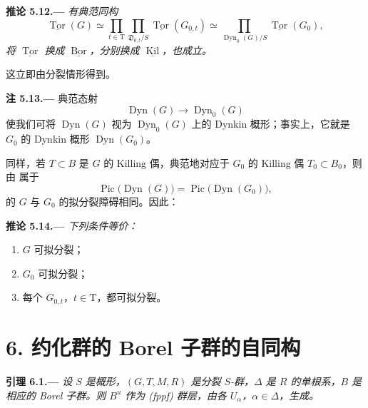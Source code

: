 \par\medskip\noindent{}\textbf{推论 5.12.---}\enspace
\emph{有典范同构}
\[
  \underline{\operatorname{Tor}}(G)
  \simeq
  \prod_{t\in\mathrm T}
  \prod_{\mathfrak D_{0,t}/S}
    \underline{\operatorname{Tor}}(G_{0,t})
  \simeq
  \prod_{\operatorname{Dyn}_0(G)/S}
    \underline{\operatorname{Tor}}(G_0),
\]
\emph{将 \(\underline{\operatorname{Tor}}\) 换成 \(\underline{\operatorname{Bor}}\)，分别换成 \(\underline{\operatorname{Kil}}\)，也成立。}

这立即由分裂情形得到。

\par\medskip\noindent{}\textbf{注 5.13.---}\enspace
典范态射
\[
  \operatorname{Dyn}(G)\longrightarrow\operatorname{Dyn}_0(G)
\]
使我们可将 \(\operatorname{Dyn}(G)\) 视为 \(\operatorname{Dyn}_0(G)\) 上的 Dynkin 概形；事实上，它就是 \(G_0\) 的 Dynkin 概形 \(\operatorname{Dyn}(G_0)\)。

同样，若 \(T\subset B\) 是 \(G\) 的 Killing 偶，典范地对应于 \(G_0\) 的 Killing 偶 \(T_0\subset B_0\)，则由  属于
\[
  \operatorname{Pic}\bigl(\operatorname{Dyn}(G)\bigr)
  =
  \operatorname{Pic}\bigl(\operatorname{Dyn}(G_0)\bigr),
\]
的 \(G\) 与 \(G_0\) 的拟分裂障碍相同。因此：

\par\medskip\noindent{}\textbf{推论 5.14.---}\enspace
\emph{下列条件等价：}
\begin{enumerate}
\item[(i)] \(G\) 可拟分裂；
\item[(ii)] \(G_0\) 可拟分裂；
\item[(iii)] 每个 \(G_{0,t}\)，\(t\in\mathrm T\)，都可拟分裂。
\end{enumerate}

\section*{6. 约化群的 Borel 子群的自同构}

\par\medskip\noindent{}\textbf{引理 6.1.---}\enspace
\emph{设 \(S\) 是概形，\((G,T,M,R)\) 是分裂 \(S\)-群，\(\Delta\) 是 \(R\) 的单根系，\(B\) 是相应的 Borel 子群。则 \(B^u\) 作为 \textup{(fppf)} 群层，由各 \(U_\alpha\)，\(\alpha\in\Delta\)，生成。}

